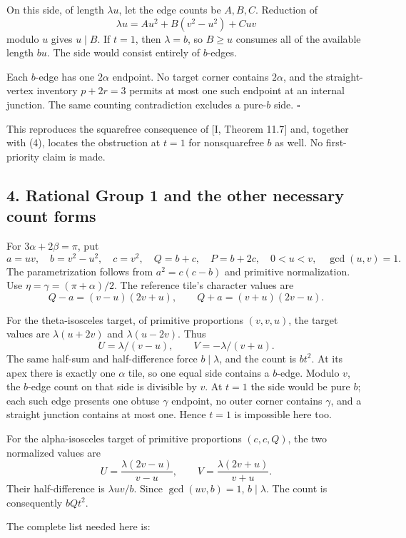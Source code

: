 \documentclass[
  11pt,
]{article}
\begin{document}
On this side, of length \(\lambda u\), let the edge counts be \(A,B,C\).
Reduction of \[\lambda u=A u^2+B(v^2-u^2)+Cuv\] modulo \(u\) gives
\(u\mid B\). If \(t=1\), then \(\lambda=b\), so \(B\ge u\) consumes all
of the available length \(bu\). The side would consist entirely of
\(b\)-edges.

Each \(b\)-edge has one \(2\alpha\) endpoint. No target corner contains
\(2\alpha\), and the straight-vertex inventory \(p+2r=3\) permits at
most one such endpoint at an internal junction. The same counting
contradiction excludes a pure-\(b\) side. \(\square\)

This reproduces the squarefree consequence of {[}I, Theorem 11.7{]} and,
together with (4), locates the obstruction at \(t=1\) for nonsquarefree
\(b\) as well. No first-priority claim is made.

\subsection{4. Rational Group 1 and the other necessary count
forms}\label{rational-group-1-and-the-other-necessary-count-forms}

For \(3\alpha+2\beta=\pi\), put \[a=uv,\quad b=v^2-u^2,\quad c=v^2,\quad
Q=b+c,
\quad P=b+2c,\quad 0<u<v,\quad\gcd(u,v)=1.\] The parametrization follows
from \(a^2=c(c-b)\) and primitive normalization. Use
\(\eta=\gamma=(\pi+\alpha)/2\). The reference tile's character values
are \[Q-a=(v-u)(2v+u),\qquad Q+a=(v+u)(2v-u).\]

For the theta-isosceles target, of primitive proportions \((v,v,u)\),
the target values are \(\lambda(u+2v)\) and \(\lambda(u-2v)\). Thus
\[U=\lambda/(v-u),\qquad V=-\lambda/(v+u).\] The same half-sum and
half-difference force \(b\mid\lambda\), and the count is \(bt^2\). At
its apex there is exactly one \(\alpha\) tile, so one equal side
contains a \(b\)-edge. Modulo \(v\), the \(b\)-edge count on that side
is divisible by \(v\). At \(t=1\) the side would be pure \(b\); each
such edge presents one obtuse \(\gamma\) endpoint, no outer corner
contains \(\gamma\), and a straight junction contains at most one. Hence
\(t=1\) is impossible here too.

For the alpha-isosceles target of primitive proportions \((c,c,Q)\), the
two normalized values are \[U=\frac{\lambda(2v-u)}{v-u},\qquad
V=\frac{\lambda(2v+u)}{v+u}.\] Their half-difference is
\(\lambda uv/b\). Since \(\gcd(uv,b)=1\), \(b\mid\lambda\). The count is
consequently \(bQt^2\).

The complete list needed here is:
\end{document}
